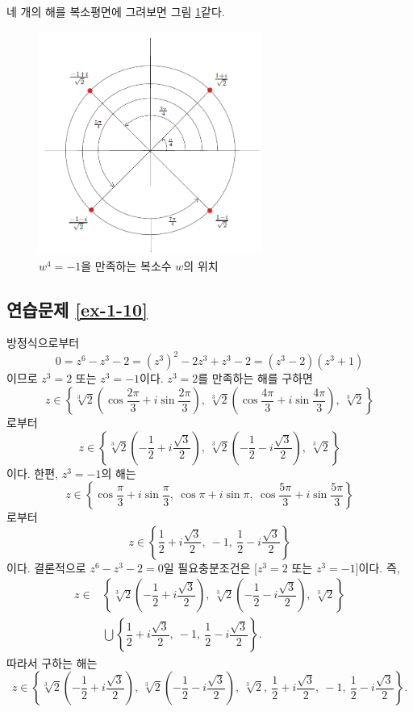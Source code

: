 네 개의 해를 복소평면에 그려보면 그림 \ref{fig-5-3}\과 같다.

\begin{figure}[h!]
\begin{center}
\includegraphics[width=0.65\textwidth]{./Solution/figs/fig-5-3}
\end{center}
\caption{$w^4=-1$을 만족하는 복소수 $w$의 위치}
\label{fig-5-3}
\end{figure}

\subsection*{연습문제 \ref{ex-1-10}}

방정식으로부터
\[
0=z^6 -z^3-2 = (z^3)^2 -2z^3 +z^3 -2 = (z^3-2)(z^3+1)
\]
이므로
$z^3=2$ 또는 $z^3=-1$이다.
$z^3=2$를 만족하는 해를 구하면
\[
z\in \left\{ \sqrt[3]{2} \left( \cos\dfrac{2\pi}3 + i\sin\dfrac{2\pi}3\right), \
\sqrt[3]{2} \left( \cos\dfrac{4\pi}3 + i\sin\dfrac{4\pi}3\right),  \
\sqrt[3]{2} \right\}
\]
로부터 
\[
z\in \left\{ \sqrt[3]{2} \left( - \dfrac12+ i\dfrac{\sqrt{3}}2\right), \
\sqrt[3]{2} \left( -\dfrac12 - i\dfrac{\sqrt{3}}2\right),  \
\sqrt[3]{2} \right\}
\]
이다. 한편, $z^3=-1$의 해는
\[
z\in\left\{ \cos\dfrac\pi3 + i\sin\dfrac\pi3,\  \cos\pi + i\sin\pi, \
\cos\dfrac{5\pi}3 + i\sin\dfrac{5\pi}3 \right\}
\]
로부터 
\[
z\in \left\{ \dfrac12+ i\dfrac{\sqrt{3}}2, \ -1, \
\dfrac12 - i\dfrac{\sqrt{3}}2 \right\}
\]
이다. 결론적으로
$z^6 - z^3-2=0$일 필요충분조건은 [$z^3=2$ 또는 $z^3=-1$]이다.
즉,
\begin{align*}
z\in & \left\{ \sqrt[3]{2} \left( - \dfrac12+ i\dfrac{\sqrt{3}}2\right), \
\sqrt[3]{2} \left( -\dfrac12 - i\dfrac{\sqrt{3}}2\right), \
\sqrt[3]{2} \right\}\\
&\bigcup \left\{ \dfrac12+ i\dfrac{\sqrt{3}}2,\ -1, \
\dfrac12 - i\dfrac{\sqrt{3}}2 \right\}.
\end{align*}
따라서 구하는 해는
\[
z\in \left\{ \sqrt[3]{2} \left( - \dfrac12+ i\dfrac{\sqrt{3}}2\right), \
\sqrt[3]{2} \left( -\dfrac12 - i\dfrac{\sqrt{3}}2\right), \
\sqrt[3]{2}, \
\dfrac12+ i\dfrac{\sqrt{3}}2, \ -1, \
\dfrac12 - i\dfrac{\sqrt{3}}2 \right\}.
\]

